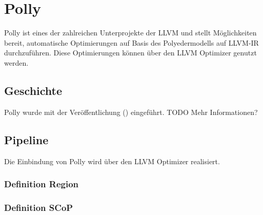 \chapter{Polly}
Polly ist eines der zahlreichen Unterprojekte der \ac{LLVM} und stellt Möglichkeiten bereit, automatische Optimierungen auf Basis des Polyedermodells auf \ac{LLVM-IR} durchzuführen.
Diese Optimierungen können über den \ac{LLVM} Optimizer genutzt werden.
\section{Geschichte}
Polly wurde mit der Veröffentlichung (\cite{PollyGrosser}) eingeführt. TODO Mehr Informationen?

\section{Pipeline \cite{PollyPresentation}}
Die Einbindung von Polly wird über den \ac{LLVM} Optimizer realisiert.
\begin{center}
\end{center}
\subsection{Definition Region}

\subsection{Definition \ac{SCoP}}
